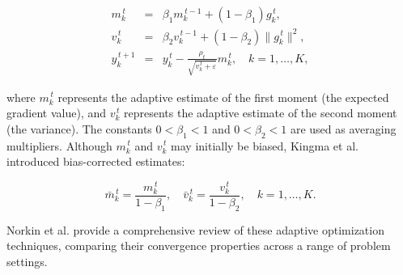 \begin{eqnarray}
    \label{adam-update-rule:eq}
    m_k^{\,t} &=& \beta_1 m_k^{\,t-1} + (1 - \beta_1) g_k^{\,t}, \nonumber \\
    v_k^{\,t} &=& \beta_2 v_k^{\,t-1} + (1 - \beta_2) \|g_k^{\,t}\|^2, \nonumber \\
    y_k^{\,t+1} &=& y_k^{\,t} - \frac{\rho_t}{\sqrt{v_k^{\,t} + \varepsilon}} m_k^{\,t}, \quad k=1,\ldots,K,
\end{eqnarray}

\noindent where $m_k^{\,t}$ represents the adaptive estimate of the first moment (the expected gradient value), and $v_k^{\,t}$ represents the adaptive estimate of the second moment (the variance). The constants $0 < \beta_1 < 1$ and $0 < \beta_2 < 1$ are used as averaging multipliers. Although $m_k^{\,t}$ and $v_k^{\,t}$ may initially be biased, Kingma et al. introduced bias-corrected estimates:

\begin{equation}
    \label{adam-corrected-estimations:eq}
    \bar{m}_k^{\,t} = \frac{m_k^{\,t}}{1 - \beta_1}, \quad \bar{v}_k^{\,t} = \frac{v_k^{\,t}}{1 - \beta_2}, \quad k=1,\ldots,K.
\end{equation}

Norkin et al. \cite{Norkin_Kozyriev_Norkin_2024} provide a comprehensive review of these adaptive optimization techniques, comparing their convergence properties across a range of problem settings.